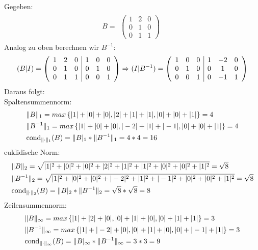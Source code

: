 Gegeben:\\
\begin{align*} 
B=
\begin{split}
\begin{pmatrix}
1 & 2 & 0 \\
0 & 1 & 0 \\
0 & 1 & 1
\end{pmatrix}
\end{split}
\end{align*}
Analog zu oben berechnen wir $B^{-1}$:\\
\begin{align*}
(B|I)=
\begin{split}
\begin{array}({ccc|ccc})
1 & 2 & 0 & 1 & 0 & 0\\
0 & 1 & 0 & 0 & 1 & 0\\
0 & 1 & 1 & 0 & 0 & 1
\end{array}
\Rightarrow(I|B^{-1})=
\begin{array}({ccc|ccc})
1 & 0 & 0 &1 & -2 & 0 \\
0 & 1 & 0 &0 & 1 & 0 \\
0 & 0 & 1 &0 & -1 & 1  
\end{array}
\end{split}
\end{align*}
Daraus folgt:\\
Spaltensummennorm:
\begin{align*}
\begin{split}
&\|B\|_1=max \left\lbrace|1|+|0|+|0|, |2|+|1|+|1|, |0|+|0|+|1|\right\rbrace = 4\\
&\|B^{-1}\|_1=max \left\lbrace|1|+|0|+|0|, |-2|+|1|+|-1|, |0|+|0|+|1|\right\rbrace = 4\\
&\mathrm{cond}_{\| \cdot \|_1}(B)=\|B|_1*\|B^{-1}\|_1= 4 * 4 = 16\\
\end{split}
\end{align*}
euklidische Norm:
\begin{align*}
\begin{split}
&\|B\|_2=\sqrt{|1|^2+|0|^2+|0|^2+|2|^2+|1|^2+|1|^2+|0|^2+|0|^2+|1|^2}=\sqrt{8}\\
&\|B^{-1}\|_2=\sqrt{|1|^2+|0|^2+|0|^2+|-2|^2+|1|^2+|-1|^2+|0|^2+|0|^2+|1|^2}=\sqrt{8}\\
&\mathrm{cond}_{\| \cdot \|_2}(B)=\|B|_2*\|B^{-1}\|_2=\sqrt{8}*\sqrt{8}=8\\
\end{split}
\end{align*}
Zeilensummennorm:
\begin{align*}
\begin{split}
&\|B\|_\infty = max \left\lbrace|1|+|2|+|0|, |0|+|1|+|0|,|0|+|1|+|1|\right\rbrace = 3\\
&\|B^{-1}\|_\infty = max \left\lbrace|1|+|-2|+|0|, |0|+|1|+|0|,|0|+|-1|+|1|\right\rbrace = 3\\
&\mathrm{cond}_{\| \cdot \|_\infty}(B)=\|B|_\infty*\|B^{-1}\|_\infty = 3 * 3 = 9\\
\end{split}
\end{align*}